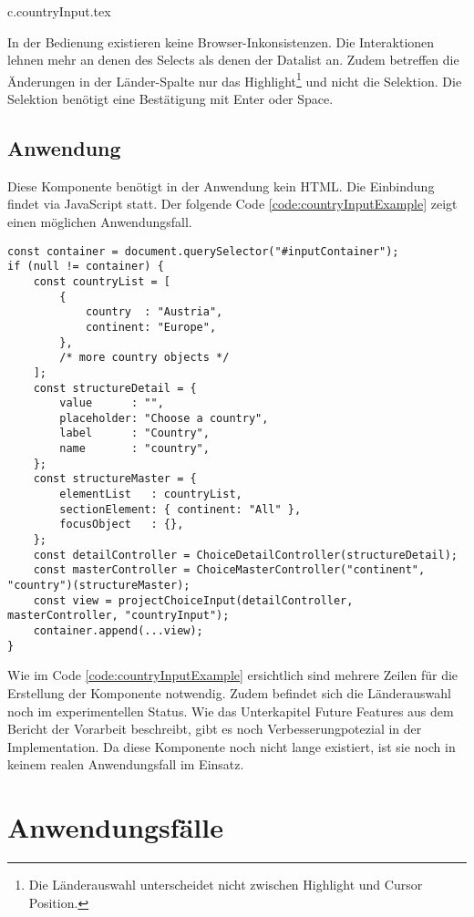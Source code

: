 {c.countryInput.tex}

In der Bedienung existieren keine Browser-Inkonsistenzen. 
Die Interaktionen lehnen mehr an denen des Selects als denen der Datalist an. 
Zudem betreffen die Änderungen in der Länder-Spalte nur das Highlight\footnote{
    Die Länderauswahl unterscheidet nicht zwischen Highlight und Cursor Position. 
} und nicht die Selektion. 
Die Selektion benötigt eine Bestätigung mit Enter oder Space. 


\subsection{Anwendung}
\label{sec:countryChoiceUse}

Diese Komponente benötigt in der Anwendung kein HTML. 
Die Einbindung findet via JavaScript statt. 
Der folgende Code \ref{code:countryInputExample} zeigt einen möglichen Anwendungsfall. 

\begin{lstlisting}[style = htmlcssjs, caption = Länderauswahl Beispiel, label = code:countryInputExample]
const container = document.querySelector("#inputContainer");
if (null != container) {
    const countryList = [
        {
            country  : "Austria",
            continent: "Europe",
        },
        /* more country objects */
    ];
    const structureDetail = {
        value      : "",
        placeholder: "Choose a country",
        label      : "Country",
        name       : "country",
    };
    const structureMaster = {
        elementList   : countryList,
        sectionElement: { continent: "All" },
        focusObject   : {},
    };
    const detailController = ChoiceDetailController(structureDetail);
    const masterController = ChoiceMasterController("continent", "country")(structureMaster);
    const view = projectChoiceInput(detailController, masterController, "countryInput");
    container.append(...view);
}
\end{lstlisting}

Wie im Code \ref{code:countryInputExample} ersichtlich sind mehrere Zeilen für die Erstellung der Komponente notwendig. 
Zudem befindet sich die Länderauswahl noch im experimentellen Status. 
Wie das Unterkapitel Future Features aus dem Bericht\citemarktext{
    [\cite{ip5}]
} der Vorarbeit beschreibt, gibt es noch Verbesserungpotezial in der Implementation. 
Da diese Komponente noch nicht lange existiert, ist sie noch in keinem realen Anwendungsfall im Einsatz. 


\section{Anwendungsfälle}
\label{sec:useCases}

